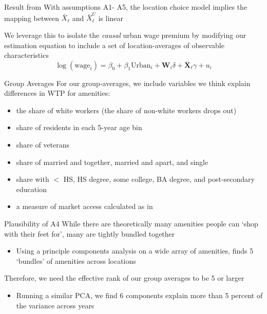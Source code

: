 \documentclass[aspectratio=169,t]{beamer}
\newcommand{\urban}{{\text{Urban}}}
\begin{document}
\begin{frame}{Result from \citet{altonji2018estimating}}
  With assumptions {\color{blue} A1}-{\color{blue} A5}, the location choice model implies the mapping between $\bar{X}_{\ell}$ and $\bar{X}^U_{\ell}$ is linear
  
  \bigskip
  We leverage this to isolate the \emph{causal} urban wage premium by modifying our estimation equation to include a set of location-averages of observable characteristics
  $$
    \log(\text{wage}_i) = \beta_0 + \beta_1 \urban_i + \bm{W}_i \delta + \bar{\bm{X}}_\ell \gamma + u_i
  $$
\end{frame}

\begin{frame}{Group Averages}
  For our group-averages, we include variables we think explain differences in WTP for amenities:
  \begin{itemize}
    \item the share of white workers (the share of non-white workers drops out)
    \item share of residents in each 5-year age bin
    \item share of veterans
    \item share of married and together, married and apart, and single
    \item share with $<$ HS, HS degree, some college, BA degree, and post-secondary education
    \item a measure of market access calculated as in \citet{Jaworski_Kitchens_2019} 
  \end{itemize} 
\end{frame}

\begin{frame}{Plausibility of {\color{blue} A4}}
  While there are theoretically many amenities people can `shop with their feet for', many are tightly bundled together
  \begin{itemize}
    \item Using a principle components analysis on a wide array of amenities, \citet{Diamond_2016} finds 5 `bundles' of amenities across locations 
  \end{itemize}

  \bigskip
  Therefore, we need the effective rank of our group averages to be 5 or larger
  \begin{itemize}
    \item Running a similar PCA, we find 6 components explain more than 5 percent of the variance across years
  \end{itemize}
\end{frame}
\end{document}
